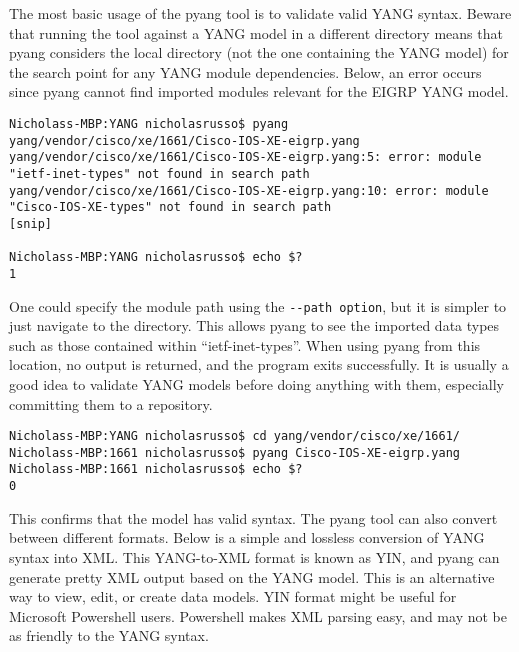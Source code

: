The most basic usage of the pyang tool is to validate valid YANG syntax.
Beware that running the tool against a YANG model in a different directory
means that pyang considers the local directory (not the one containing the
YANG model) for the search point for any YANG module dependencies. Below, an
error occurs since pyang cannot find imported modules relevant for the EIGRP
YANG model.

\begin{verbatim}
Nicholass-MBP:YANG nicholasrusso$ pyang yang/vendor/cisco/xe/1661/Cisco-IOS-XE-eigrp.yang 
yang/vendor/cisco/xe/1661/Cisco-IOS-XE-eigrp.yang:5: error: module "ietf-inet-types" not found in search path
yang/vendor/cisco/xe/1661/Cisco-IOS-XE-eigrp.yang:10: error: module "Cisco-IOS-XE-types" not found in search path
[snip]

Nicholass-MBP:YANG nicholasrusso$ echo $?
1
\end{verbatim}

One could specify the module path using the \verb|--path option|, but it is
simpler to just navigate to the directory. This allows pyang to see the
imported data types such as those contained within ``ietf-inet-types''. When
using pyang from this location, no output is returned, and the program exits
successfully. It is usually a good idea to validate YANG models before doing
anything with them, especially committing them to a repository.

\begin{verbatim}
Nicholass-MBP:YANG nicholasrusso$ cd yang/vendor/cisco/xe/1661/
Nicholass-MBP:1661 nicholasrusso$ pyang Cisco-IOS-XE-eigrp.yang
Nicholass-MBP:1661 nicholasrusso$ echo $?
0
\end{verbatim}

This confirms that the model has valid syntax. The pyang tool can also convert
between different formats. Below is a simple and lossless conversion of YANG
syntax into XML. This YANG-to-XML format is known as YIN, and pyang can
generate pretty XML output based on the YANG model. This is an alternative way
to view, edit, or create data models. YIN format might be useful for Microsoft
Powershell users. Powershell makes XML parsing easy, and may not be as
friendly to the YANG syntax.

